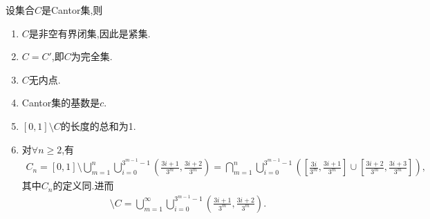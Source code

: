\documentclass[../../main.tex]{subfiles}%
\begin{document}
\begin{theorem}[Cantor集的基本性质]\label{theorem:Cantor集的基本性质}
设集合$C$是Cantor集,则
\begin{enumerate}[(1)]
\item $C$是非空有界闭集,因此是紧集.

\item $C = C'$,即$C$为完全集.

\item $C$无内点.

\item Cantor集的基数是$c$.

\item $[0,1]\setminus C$的长度的总和为1.

\item 对$\forall n\geqslant 2$,有
\begin{align*}
C_n = [0,1] \setminus \bigcup\limits_{m=1}^n \bigcup\limits_{i=0}^{3^{m-1}-1} \left( \frac{3i+1}{3^m}, \frac{3i+2}{3^m} \right) = \bigcap\limits_{m=1}^n \bigcup\limits_{i=0}^{3^{m-1}-1} \left( \left[ \frac{3i}{3^m}, \frac{3i+1}{3^m} \right] \cup \left[ \frac{3i+2}{3^m}, \frac{3i+3}{3^m} \right] \right),
\end{align*}
其中$C_n$的定义同.进而
\begin{align*}
[0,1]\setminus C=\bigcup_{m=1}^{\infty}{\bigcup_{i=0}^{3^{m-1}-1}{\left( \frac{3i+1}{3^m},\frac{3i+2}{3^m} \right)}}.
\end{align*}
\end{enumerate}
\end{theorem}
\end{document}
